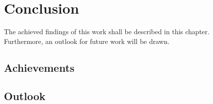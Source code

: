 \chapter{Conclusion} \label{chap:8}

The achieved findings of this work shall be described in this chapter. Furthermore, an outlook for future work will be drawn.

\section{Achievements}



\section{Outlook}

